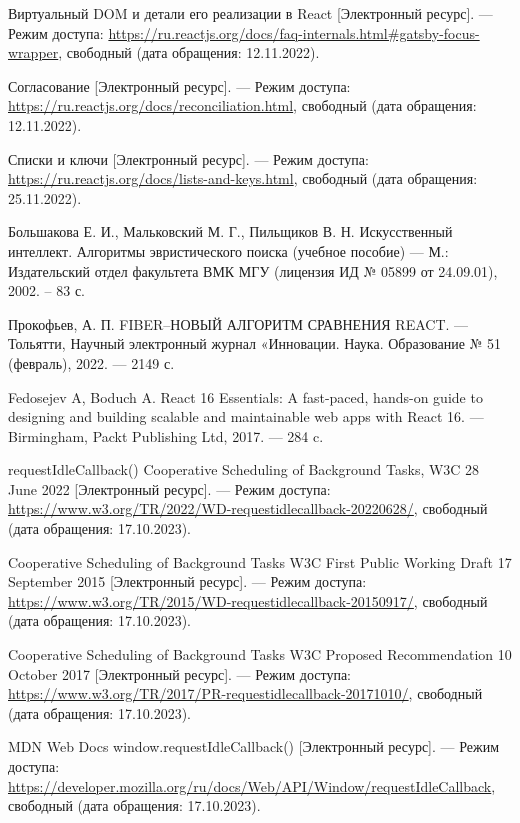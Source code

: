 \begin{thebibliography}{}
	Виртуальный DOM и детали его реализации в React [Электронный ресурс]. --- Режим доступа: \url{https://ru.reactjs.org/docs/faq-internals.html#gatsby-focus-wrapper}, свободный (дата обращения: 12.11.2022).
	
	Согласование [Электронный ресурс]. --- Режим доступа: \url{https://ru.reactjs.org/docs/reconciliation.html}, свободный (дата обращения: 12.11.2022).
	
	Списки и ключи [Электронный ресурс]. --- Режим доступа: \url{https://ru.reactjs.org/docs/lists-and-keys.html}, свободный (дата обращения: 25.11.2022).
	
	Большакова Е. И., Мальковский М. Г., Пильщиков В. Н. Искусственный интеллект. Алгоритмы эвристического поиска (учебное пособие) --- М.: Издательский отдел факультета ВМК МГУ (лицензия ИД № 05899 от 24.09.01),
	2002. -- 83 с.

	Прокофьев, А. П. FIBER–НОВЫЙ АЛГОРИТМ СРАВНЕНИЯ REACT. --- Тольятти, Научный электронный журнал «Инновации. Наука. Образование № 51 (февраль), 2022. --- 2149 с.

	Fedosejev A, Boduch A. React 16 Essentials: A fast-paced, hands-on guide to designing and building scalable and maintainable web apps with React 16. --- Birmingham, Packt Publishing Ltd, 2017. --- 284 c.

	requestIdleCallback() Cooperative Scheduling of Background Tasks, W3C 28 June 2022 [Электронный ресурс]. --- Режим доступа: \url{https://www.w3.org/TR/2022/WD-requestidlecallback-20220628/}, свободный (дата обращения: 17.10.2023).

	Cooperative Scheduling of Background Tasks
W3C First Public Working Draft 17 September 2015 [Электронный ресурс]. --- Режим доступа: \url{https://www.w3.org/TR/2015/WD-requestidlecallback-20150917/}, свободный (дата обращения: 17.10.2023).

	Cooperative Scheduling of Background Tasks
W3C Proposed Recommendation 10 October 2017 [Электронный ресурс]. --- Режим доступа: \url{https://www.w3.org/TR/2017/PR-requestidlecallback-20171010/}, свободный (дата обращения: 17.10.2023).

	MDN Web Docs window.requestIdleCallback() [Электронный ресурс]. --- Режим доступа: \url{https://developer.mozilla.org/ru/docs/Web/API/Window/requestIdleCallback}, свободный (дата обращения: 17.10.2023).


\end{thebibliography}
